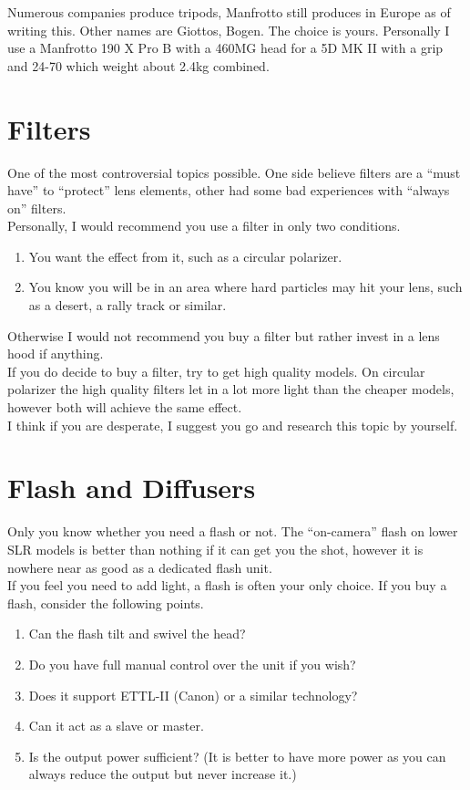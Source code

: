 Numerous companies produce tripods, Manfrotto still produces in Europe as of writing this.
Other names are Giottos, Bogen. The choice is yours. Personally I use a Manfrotto 190 X Pro B with a 460MG head for a 5D MK II with a grip and 24-70 which weight about 2.4kg combined.

\section{Filters}

One of the most controversial topics possible. One side believe filters are a ``must have'' to ``protect'' lens elements, other had some bad experiences with ``always on'' filters.
\\
Personally, I would recommend you use a filter in only two conditions.
\begin{enumerate}
	\item You want the effect from it, such as a circular polarizer.
	\item You know you will be in an area where hard particles may hit your lens, such as a desert, a rally track or similar.
\end{enumerate}

Otherwise I would not recommend you buy a filter but rather invest in a lens hood if anything.
\\
If you do decide to buy a filter, try to get high quality models. On circular polarizer the high quality filters let in a lot more light than the cheaper models, however both will achieve the same effect.
\\
I think if you are desperate, I suggest you go and research this topic by yourself.


\section{Flash and Diffusers}

Only you know whether you need a flash or not. The ``on-camera'' flash on lower SLR models is better than nothing if it can get you the shot, however it is nowhere near as good as a dedicated flash unit.
\\
If you feel you need to add light, a flash is often your only choice. If you buy a flash, consider the following points.

\begin{enumerate}
	\item Can the flash tilt and swivel the head?
	\item Do you have full manual control over the unit if you wish?
	\item Does it support ETTL-II (Canon) or a similar technology?
	\item Can it act as a slave or master.
	\item Is the output power sufficient? (It is better to have more power as you can always reduce the output but never increase it.)
\end{enumerate}

